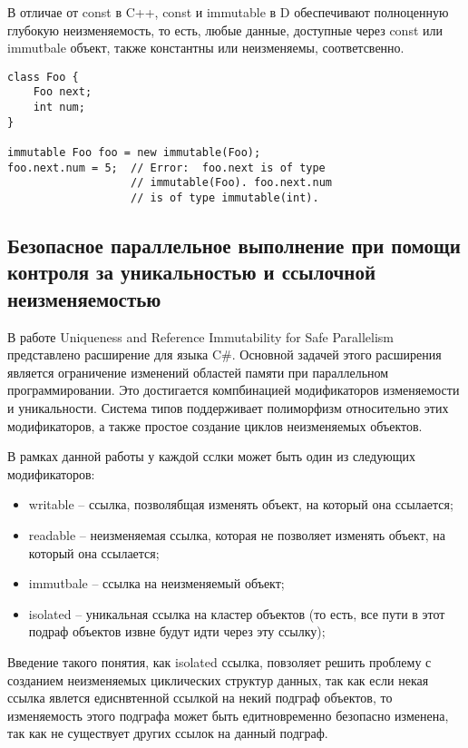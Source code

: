 В отличае от const в C++, const и immutable в D обеспечивают полноценную глубокую неизменяемость, то есть, любые данные, доступные через const или immutbale объект, также константны или неизменяемы, соответсвенно.

\begin{lstlisting}[caption=const vs immutable, label=code:d_const_vs_immutable]
class Foo {
    Foo next;
    int num;
}
 
immutable Foo foo = new immutable(Foo);
foo.next.num = 5;  // Error:  foo.next is of type 
                   // immutable(Foo). foo.next.num 
                   // is of type immutable(int).
\end{lstlisting}

\subsection{Безопасное параллельное выполнение при помощи контроля за уникальностью и ссылочной неизменяемостью}

В работе Uniqueness and Reference Immutability for Safe Parallelism \cite{Gordon2012} представлено расширение для языка C\#. Основной задачей этого расширения является ограничение изменений областей памяти при параллельном программировании. Это достигается компбинацией модификаторов изменяемости и уникальности. Система типов поддерживает полиморфизм относительно этих модификаторов, а также простое создание циклов неизменяемых объектов.

В рамках данной работы у каждой сслки может быть один из следующих модификаторов:
\begin{itemize}
\item writable -- ссылка, позволябщая изменять объект, на который она ссылается;
\item readable -- неизменяемая ссылка, которая не позволяет изменять объект, на который она ссылается;
\item immutbale -- ссылка на неизменяемый объект;
\item isolated -- уникальная ссылка на кластер объектов (то есть, все пути в этот подраф объектов извне будут идти через эту ссылку);
\end{itemize}

Введение такого понятия, как isolated ссылка, повзоляет решить проблему с созданием неизменяемых циклических структур данных, так как если некая ссылка явлется едиснвтенной ссылкой на некий подграф объектов, то изменяемость этого подграфа может быть едитновременно безопасно изменена, так как не существует других ссылок на данный подграф. 

